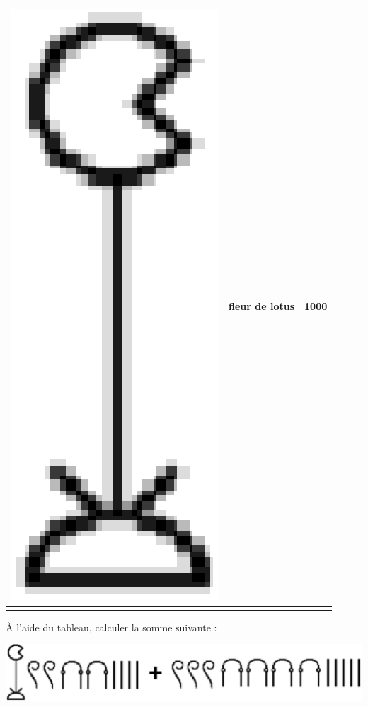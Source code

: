 \documentclass[letterpaper, 12pt]{article}
\begin{document}
\begin{center}
\begin{tabular}{|c|c|c|}
\includegraphics[scale=0.08]{Hiero1000.eps} & fleur de lotus & 1000\\[4mm] \hline
\multicolumn{3}{c}{}\\
\end{tabular}
\end{center}

\`A l'aide du tableau, calculer la somme suivante :
\begin{center}
\includegraphics[scale=0.35]{1569.eps}\\
\end{center}
\end{document}
